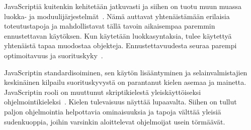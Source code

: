
JavaScriptiä kuitenkin kehitetään jatkuvasti ja siihen on tuotu muun muassa luokka- ja moduulijärjestelmät~\cite[14.5.~ja~15.2.]{es6}. Nämä auttavat yhtenäistämään erilaisia toteutustapoja ja mahdollistavat tällä tavoin aikaisempaa paremmin ennustettavan käytöksen. Kun käytetään luokkasyntaksia, tulee käytettyä yhtenäistä tapaa muodostaa objekteja. Ennustettavuudesta seuraa parempi optimoitavuus ja suorituskyky~\cite[s.~497]{Ahn2014}.

JavaScriptin standardisoiminen, sen käytön lisääntyminen ja selainvalmistajien keskinäinen kilpailu suorituskyvystä on parantanut kielen asemaa ja mainetta. JavaScriptin rooli on muuttunut skriptikielestä yleiskäyttöiseksi ohjelmointikieleksi~\cite[4.]{es6}. Kielen tulevaisuus näyttää lupaavalta. Siihen on tullut paljon ohjelmointia helpottavia ominaisuuksia ja tapoja välttää yleisiä sudenkuoppia, joihin varsinkin aloittelevat ohjelmoijat usein törmäävät.